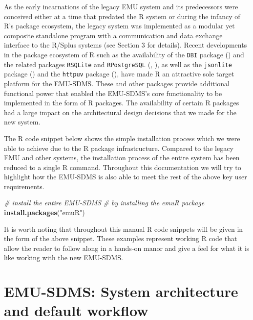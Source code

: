 \documentclass[]{book}
\newenvironment{Shaded}{\begin{snugshade}}{\end{snugshade}}
\newcommand{\CommentTok}[1]{\textcolor[rgb]{0.56,0.35,0.01}{\textit{#1}}}
\newcommand{\KeywordTok}[1]{\textcolor[rgb]{0.13,0.29,0.53}{\textbf{#1}}}
\newcommand{\NormalTok}[1]{#1}
\newcommand{\StringTok}[1]{\textcolor[rgb]{0.31,0.60,0.02}{#1}}
\begin{document}
As the early incarnations of the legacy EMU system and its predecessors were conceived either at a time that predated the R system or during the infancy of R's package ecosystem, the legacy system was implemented as a modular yet composite standalone program with a communication and data exchange interface to the R/Splus systems (see \citet{cassidy:sc2001a} Section 3 for details). Recent developments in the package ecosystem of R such as the availability of the \texttt{DBI} package (\citet{r-special-interest-group-on-databases-r-sig-db:2016a}) and the related packages \texttt{RSQLite} and \texttt{RPostgreSQL} (\citet{wickham:2014a}, \citet{conway:2016a}), as well as the \texttt{jsonlite} package (\citet{ooms:as2014a}) and the \texttt{httpuv} package (\citet{rstudio:2015a}), have made R an attractive sole target platform for the EMU-SDMS. These and other packages provide additional functional power that enabled the EMU-SDMS's core functionality to be implemented in the form of R packages. The availability of certain R packages had a large impact on the architectural design decisions that we made for the new system.

The R code snippet below shows the simple installation process which we were able to achieve due to the R package infrastructure. Compared to the legacy EMU and other systems, the installation process of the entire system has been reduced to a single R command. Throughout this documentation we will try to highlight how the EMU-SDMS is also able to meet the rest of the above key user requirements.

\begin{Shaded}
\begin{Highlighting}[]
\CommentTok{# install the entire EMU-SDMS}
\CommentTok{# by installing the emuR package}
\KeywordTok{install.packages}\NormalTok{(}\StringTok{"emuR"}\NormalTok{)}
\end{Highlighting}
\end{Shaded}

It is worth noting that throughout this manual R code snippets will be given in the form of the above snippet. These examples represent working R code that allow the reader to follow along in a hands-on manor and give a feel for what it is like working with the new EMU-SDMS.

\hypertarget{sec:overview-sysArch}{%
\section{EMU-SDMS: System architecture and default workflow}\label{sec:overview-sysArch}}
\end{document}
